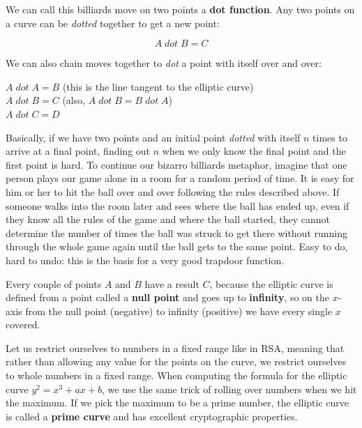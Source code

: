We can call this billiards move on two points a \textbf{dot function}. Any two points on a curve can be \textit{dotted} together to get a new point:

\begin{equation}
    A\; dot\; B = C
\end{equation}

We can also chain moves together to \textit{dot} a point with itself over and over:

\begin{center}
    $A\; dot\; A = B$ (this is the line tangent to the elliptic curve)\\
    $A\; dot\; B = C$ (also, $A\; dot\; B = B\; dot\; A$)\\
    $A\; dot\; C = D$
\end{center}

Basically, if we have two points and an initial point \textit{dotted} with itself $n$ times to arrive at a final point, finding out $n$ when we only know the final point and the first point is hard. To continue our bizarro billiards metaphor, imagine that one person plays our game alone in a room for a random period of time. It is easy for him or her to hit the ball over and over following the rules described above. If someone walks into the room later and sees where the ball has ended up, even if they know all the rules of the game and where the ball started, they cannot determine the number of times the ball was struck to get there without running through the whole game again until the ball gets to the same point. Easy to do, hard to undo: this is the basis for a very good trapdoor function.

Every couple of points $A$ and $B$ have a result $C$, because the elliptic curve is defined from a point called a \textbf{null point} and goes up to \textbf{infinity}, so on the $x$-axis from the null point (negative) to infinity (positive) we have every single $x$ covered.

Let us restrict ourselves to numbers in a fixed range like in RSA, meaning that rather than allowing any value for the points on the curve, we restrict ourselves to whole numbers in a fixed range. When computing the formula for the elliptic curve $y^2 = x^3 + ax + b$, we use the same trick of rolling over numbers when we hit the maximum. If we pick the maximum to be a prime number, the elliptic curve is called a \textbf{prime curve} and has excellent cryptographic properties.

